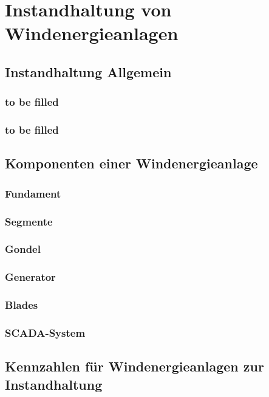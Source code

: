 \section{Instandhaltung von Windenergieanlagen}

\subsection{Instandhaltung Allgemein}

\subsubsection{to be filled}

\subsubsection{to be filled}

\subsection{Komponenten einer Windenergieanlage}

\subsubsection{Fundament}

\subsubsection{Segmente}

\subsubsection{Gondel}

\subsubsection{Generator}

\subsubsection{Blades}

\subsubsection{SCADA-System}

\subsection{Kennzahlen für Windenergieanlagen zur Instandhaltung}

